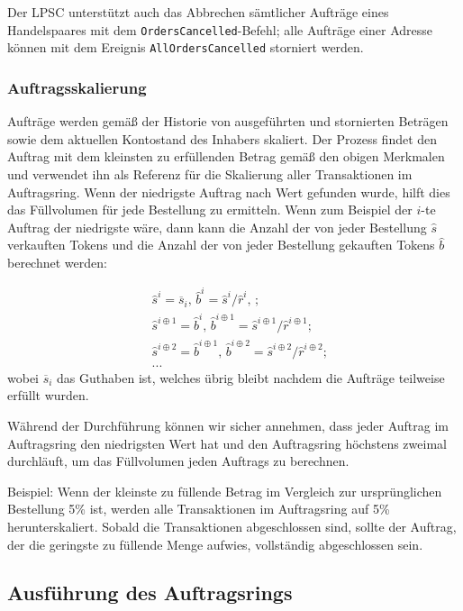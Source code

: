 \documentclass[UTF8,nofonts]{article}
\begin{document}
\begin{multicols}{2}
Der LPSC unterstützt auch das Abbrechen sämtlicher Aufträge eines Handelspaares mit dem \verb|OrdersCancelled|-Befehl; alle Aufträge einer Adresse können mit dem Ereignis \verb|AllOrdersCancelled| storniert werden.

\subsubsection{Auftragsskalierung\label{sec:order_scaling}}
Aufträge werden gemäß der Historie von ausgeführten und stornierten Beträgen sowie dem aktuellen Kontostand des Inhabers skaliert. Der Prozess findet den Auftrag mit dem kleinsten zu erfüllenden Betrag gemäß den obigen Merkmalen und verwendet ihn als Referenz für die Skalierung aller Transaktionen im Auftragsring.
Wenn der niedrigste Auftrag nach Wert gefunden wurde, hilft dies das Füllvolumen für jede Bestellung zu ermitteln. Wenn zum Beispiel der $i$-te Auftrag der niedrigste wäre,  dann kann die Anzahl der von jeder Bestellung $\hat{s}$ verkauften Tokens und die Anzahl der von jeder Bestellung gekauften Tokens $\hat{b}$ berechnet werden:

\[
\begin{split}
&\hat{s}^{i}=\overline{s}_i\text{, } \hat{b}^{i}=\hat{s}^{i}/ \hat{r}^i\text{, }\text{;}\\
&\hat{s}^{i\oplus 1}=\hat{b}^i\text{, } \hat{b}^{i\oplus 1}=\hat{s}^{i\oplus 1}/ \hat{r}^{i\oplus 1}\text{;}\\
&\hat{s}^{i\oplus 2}=\hat{b}^{i\oplus 1}\text{, } \hat{b}^{i\oplus 2}=\hat{s}^{i\oplus 2}/ \hat{r}^{i\oplus 2}\text{;}\\
& ...
\end{split}
\]
wobei $\overline{s}_i$ das Guthaben ist, welches übrig bleibt nachdem die Aufträge teilweise erfüllt wurden.

Während der Durchführung können wir sicher annehmen, dass jeder Auftrag im Auftragsring den niedrigsten Wert hat und den Auftragsring höchstens zweimal durchläuft, um das Füllvolumen jeden Auftrags zu berechnen.

Beispiel: Wenn der kleinste zu füllende Betrag im Vergleich zur ursprünglichen Bestellung 5\% ist, werden alle Transaktionen im Auftragsring auf 5\% herunterskaliert. Sobald die Transaktionen abgeschlossen sind, sollte der Auftrag, der die geringste zu füllende Menge aufwies, vollständig abgeschlossen sein.

\subsection{Ausführung des Auftragsrings\label{sec:settlement}}


\end{multicols}
\end{document}
